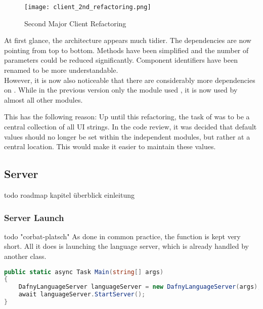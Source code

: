\begin{figure}[H]
    \centering
    \texttt{[image: client\_2nd\_refactoring.png]}
    \caption{Second Major Client Refactoring}
    \label{fig:client_2nd_refactoring}
\end{figure}

At first glance, the architecture appears much tidier.
The dependencies are now pointing from top to bottom.
Methods have been simplified and the number of parameters could be reduced significantly.
Component identifiers have been renamed to be more understandable. \\

However, it is now also noticeable that there are considerably more dependencies on .
While in the previous version only the module  used , it is now used by almost all other modules.

This has the following reason: Up until this refactoring, the task of  was to be a central collection of all UI strings. 
In the code review, it was decided that default values should no longer be set within the independent modules,
but rather at a central location.
This would make it easier to maintain these values. \\


\subsection{Server}

todo roadmap kapitel überblick einleitung

\subsubsection{Server Launch}
todo "corbat-platsch"
As done in common practice, the  function is kept very short.
All it does is launching the language server, which is already handled by another class.

\begin{lstlisting}[language=csharp, caption={Main Function}, captionpos=b, label={lst:main}]
public static async Task Main(string[] args)
{
    DafnyLanguageServer languageServer = new DafnyLanguageServer(args);
    await languageServer.StartServer();
}
\end{lstlisting}

